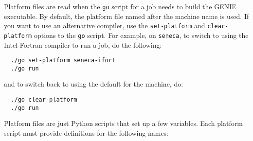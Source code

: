 \documentclass[a4paper,10pt,article]{memoir}
\begin{document}
Platform files are read when the \texttt{go} script for a job needs to
build the GENIE executable.  By default, the platform file named after
the machine name is used.  If you want to use an alternative compiler,
use the \texttt{set-platform} and \texttt{clear-platform} options to
the \texttt{go} script.  For example, on \texttt{seneca}, to switch to
using the Intel Fortran compiler to run a job, do the following:
\begin{verbatim}
  ./go set-platform seneca-ifort
  ./go run
\end{verbatim}
and to switch back to using the default for the machine, do:
\begin{verbatim}
  ./go clear-platform
  ./go run
\end{verbatim}
Platform files are just Python scripts that set up a few variables.
Each platform script must provide definitions for the following names:
\end{document}
